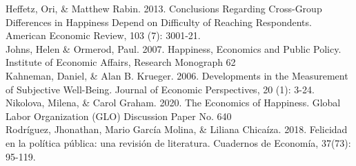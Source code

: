 \documentclass[12pt,spanish]{article}
\begin{document}
\indent Heffetz, Ori, \& Matthew Rabin. 2013. Conclusions Regarding Cross-Group Differences in Happiness Depend on Difficulty of Reaching Respondents. American Economic Review, 103 (7): 3001-21. \\

\indent Johns, Helen \& Ormerod, Paul. 2007. Happiness, Economics and Public Policy. Institute of Economic Affairs, Research Monograph 62 \\

\indent Kahneman, Daniel, \& Alan B. Krueger. 2006. Developments in the Measurement of Subjective Well-Being. Journal of Economic Perspectives, 20 (1): 3-24. \\

\indent Nikolova, Milena, \& Carol Graham. 2020. The Economics of Happiness. 
Global Labor Organization (GLO) Discussion Paper No. 640 \\

\indent Rodríguez, Jhonathan, Mario García Molina, \& Liliana Chicaíza. 2018. Felicidad en la política pública: una revisión de literatura. Cuadernos de Economía, 37(73): 95-119. \\
\end{document}
